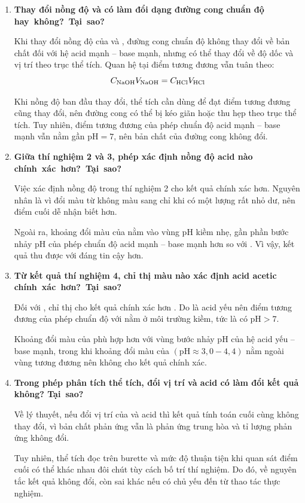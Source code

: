 \begin{enumerate}
    \item \textbf{Thay đổi nồng độ  và  có làm đổi dạng đường cong chuẩn độ \mbox{hay không? Tại sao?}}

        Khi thay đổi nồng độ của  và , đường cong chuẩn độ không thay đổi về bản chất đối với hệ acid mạnh -- base mạnh, nhưng có thể thay đổi về độ dốc và vị trí theo trục thể tích. Quan hệ tại điểm tương đương vẫn tuân theo:
        \begin{equation}
            C_{\ce{NaOH}}V_{\ce{NaOH}} = C_{\ce{HCl}}V_{\ce{HCl}}
        \end{equation}

        Khi nồng độ ban đầu thay đổi, thể tích  cần dùng để đạt điểm tương đương cũng thay đổi, nên đường cong có thể bị kéo giãn hoặc thu hẹp theo trục thể tích. Tuy nhiên, điểm tương đương của phép chuẩn độ acid mạnh -- base mạnh vẫn nằm gần \(\mathrm{pH} = 7\), nên bản chất của đường cong không đổi.

    \item \textbf{Giữa thí nghiệm 2 và 3, phép xác định nồng độ acid  nào \mbox{chính xác hơn? Tại sao?}}

        Việc xác định nồng độ  trong thí nghiệm 2 cho kết quả chính xác hơn. Nguyên nhân là vì \PhenolphthaleinWord{} đổi màu từ không màu sang \LightPinkWord{} chỉ khi có một lượng rất nhỏ  dư, nên điểm cuối dễ nhận biết hơn.

        Ngoài ra, khoảng đổi màu của \PhenolphthaleinWord{} nằm vào vùng pH kiềm nhẹ, gần phần bước nhảy pH của phép chuẩn độ acid mạnh -- base mạnh hơn so với \MethylOrangeWord{}. Vì vậy, kết quả thu được với \PhenolphthaleinWord{} đáng tin cậy hơn.

    \item \textbf{Từ kết quả thí nghiệm 4, chỉ thị màu nào xác định acid acetic \mbox{chính xác hơn? Tại sao?}}

        Đối với , chỉ thị \PhenolphthaleinWord{} cho kết quả chính xác hơn \MethylOrangeWord{}. Do  là acid yếu nên điểm tương đương của phép chuẩn độ với  nằm ở môi trường kiềm, tức là có \(\mathrm{pH} > 7\).

        Khoảng đổi màu của \PhenolphthaleinWord{} phù hợp hơn với vùng bước nhảy pH của hệ acid yếu -- base mạnh, trong khi khoảng đổi màu của \MethylOrangeWord{} \((\mathrm{pH} \approx 3,0 - 4,4)\) nằm ngoài vùng tương đương nên không cho kết quả chính xác.

    \item \textbf{Trong phép phân tích thể tích, đổi vị trí  và acid có làm đổi kết quả không? \mbox{Tại sao?}}

        Về lý thuyết, nếu đổi vị trí của  và acid thì kết quả tính toán cuối cùng không thay đổi, vì bản chất phản ứng vẫn là phản ứng trung hòa và tỉ lượng phản ứng không đổi.

        Tuy nhiên, thể tích đọc trên burette và mức độ thuận tiện khi quan sát điểm cuối có thể khác nhau đôi chút tùy cách bố trí thí nghiệm. Do đó, về nguyên tắc kết quả không đổi, còn sai khác nếu có chủ yếu đến từ thao tác thực nghiệm.
\end{enumerate}
